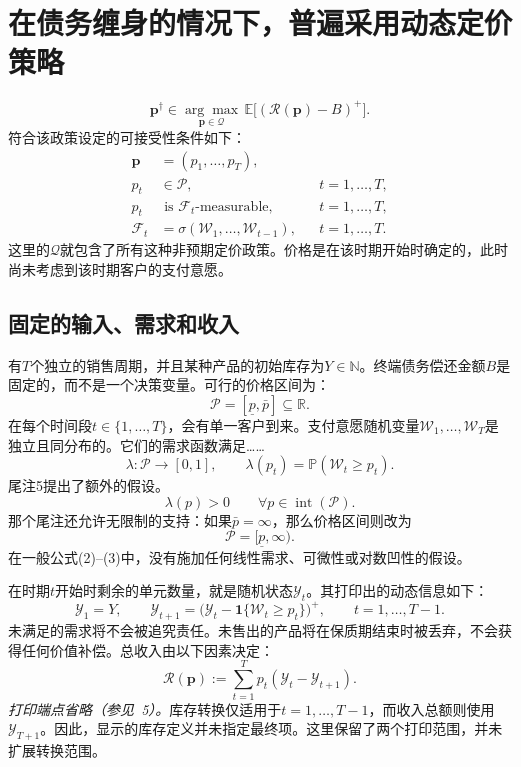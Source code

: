 \documentclass{article}
\begin{document}
\section*{在债务缠身的情况下，普遍采用动态定价策略}

\[
\mathbf p^{\dagger}\in
\underset{\mathbf p\in\mathcal Q}{\arg\max}\,
\mathbb E\bigl[(\mathcal R(\mathbf p)-B)^+\bigr].
\]
符合该政策设定的可接受性条件如下：
\[
\begin{aligned}
\mathbf p&=(p_1,\ldots,p_T),\\
p_t&\in\mathcal P, &&t=1,\ldots,T,\\
p_t&\text{ is }\mathcal F_t\text{-measurable}, &&t=1,\ldots,T,\\
\mathcal F_t&=\sigma(\mathcal W_1,\ldots,\mathcal W_{t-1}),
&&t=1,\ldots,T.
\end{aligned}
\]
这里的\(\mathcal Q\)就包含了所有这种非预期定价政策。价格是在该时期开始时确定的，此时尚未考虑到该时期客户的支付意愿。

\subsection*{固定的输入、需求和收入}

有\(T\)个独立的销售周期，并且某种产品的初始库存为\(Y\in\mathbb N\)。终端债务偿还金额\(B\)是固定的，而不是一个决策变量。可行的价格区间为：
\[
\mathcal P=[\underline p,\bar p]\subseteq\mathbb R.
\]
在每个时间段\(t\in\{1,\ldots,T\}\)，会有单一客户到来。支付意愿随机变量\(\mathcal W_1,\ldots,\mathcal W_T\)是独立且同分布的。它们的需求函数满足……
\[
\lambda:\mathcal P\longrightarrow[0,1],
\qquad
\lambda(p_t)=\mathbb P(\mathcal W_t\ge p_t).
\]
尾注5提出了额外的假设。
\[
\lambda(p)>0\qquad\forall p\in\operatorname{int}(\mathcal P).
\]
那个尾注还允许无限制的支持：如果\(\bar p=\infty\)，那么价格区间则改为
\[
\mathcal P=[\underline p,\infty).
\]
在一般公式(2)--(3)中，没有施加任何线性需求、可微性或对数凹性的假设。

在时期\(t\)开始时剩余的单元数量，就是随机状态\(\mathcal Y_t\)。其打印出的动态信息如下：
\[
\mathcal Y_1=Y,\qquad
\mathcal Y_{t+1}
=\bigl(\mathcal Y_t-\mathbf 1\{\mathcal W_t\ge p_t\}\bigr)^+,
\qquad t=1,\ldots,T-1.
\]
未满足的需求将不会被追究责任。未售出的产品将在保质期结束时被丢弃，不会获得任何价值补偿。总收入由以下因素决定：
\[
\mathcal R(\mathbf p):=
\sum_{t=1}^{T}p_t(\mathcal Y_t-\mathcal Y_{t+1}).
\]
\emph{打印端点省略（参见~5）。}库存转换仅适用于\(t=1,\ldots,T-1\)，而收入总额则使用\(\mathcal Y_{T+1}\)。因此，显示的库存定义并未指定最终项。这里保留了两个打印范围，并未扩展转换范围。
\end{document}
